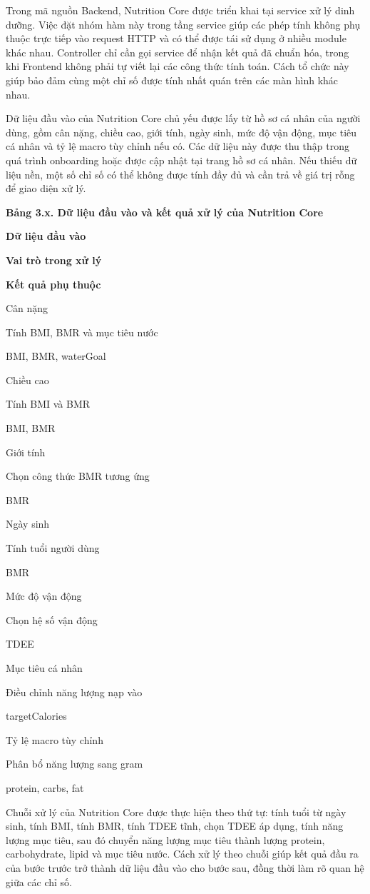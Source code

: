 \documentclass[12pt, a4paper]{report}
\begin{document}
Trong mã nguồn Backend, Nutrition Core được triển khai tại service xử lý dinh dưỡng. Việc đặt nhóm hàm này trong tầng service giúp các phép tính không phụ thuộc trực tiếp vào request HTTP và có thể được tái sử dụng ở nhiều module khác nhau. Controller chỉ cần gọi service để nhận kết quả đã chuẩn hóa, trong khi Frontend không phải tự viết lại các công thức tính toán. Cách tổ chức này giúp bảo đảm cùng một chỉ số được tính nhất quán trên các màn hình khác nhau.

Dữ liệu đầu vào của Nutrition Core chủ yếu được lấy từ hồ sơ cá nhân của người dùng, gồm cân nặng, chiều cao, giới tính, ngày sinh, mức độ vận động, mục tiêu cá nhân và tỷ lệ macro tùy chỉnh nếu có. Các dữ liệu này được thu thập trong quá trình onboarding hoặc được cập nhật tại trang hồ sơ cá nhân. Nếu thiếu dữ liệu nền, một số chỉ số có thể không được tính đầy đủ và cần trả về giá trị rỗng để giao diện xử lý.

\textbf{Bảng 3.x. Dữ liệu đầu vào và kết quả xử lý của Nutrition Core}

\textbf{Dữ liệu đầu vào}

\textbf{Vai trò trong xử lý}

\textbf{Kết quả phụ thuộc}

Cân nặng

Tính BMI, BMR và mục tiêu nước

BMI, BMR, waterGoal

Chiều cao

Tính BMI và BMR

BMI, BMR

Giới tính

Chọn công thức BMR tương ứng

BMR

Ngày sinh

Tính tuổi người dùng

BMR

Mức độ vận động

Chọn hệ số vận động

TDEE

Mục tiêu cá nhân

Điều chỉnh năng lượng nạp vào

targetCalories

Tỷ lệ macro tùy chỉnh

Phân bổ năng lượng sang gram

protein, carbs, fat

Chuỗi xử lý của Nutrition Core được thực hiện theo thứ tự: tính tuổi từ ngày sinh, tính BMI, tính BMR, tính TDEE tĩnh, chọn TDEE áp dụng, tính năng lượng mục tiêu, sau đó chuyển năng lượng mục tiêu thành lượng protein, carbohydrate, lipid và mục tiêu nước. Cách xử lý theo chuỗi giúp kết quả đầu ra của bước trước trở thành dữ liệu đầu vào cho bước sau, đồng thời làm rõ quan hệ giữa các chỉ số.
\end{document}
